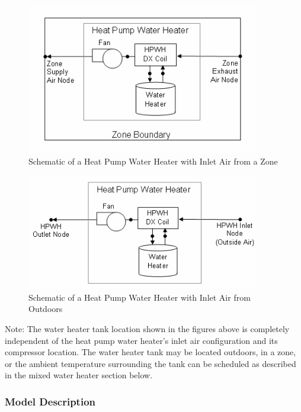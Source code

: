 \begin{figure}[hbtp] %
\centering
\includegraphics[width=0.9\textwidth, height=0.9\textheight, keepaspectratio=true]{media/image6856.png}
\caption{Schematic of a Heat Pump Water Heater with Inlet Air from a Zone \protect \label{fig:schematic-of-a-heat-pump-water-heater-with}}
\end{figure}

\begin{figure}[hbtp] %
\centering
\includegraphics[width=0.9\textwidth, height=0.9\textheight, keepaspectratio=true]{media/image6857.png}
\caption{Schematic of a Heat Pump Water Heater with Inlet Air from Outdoors \protect \label{fig:schematic-of-a-heat-pump-water-heater-with-001}}
\end{figure}

Note: The water heater tank location shown in the figures above is completely independent of the heat pump water heater's inlet air configuration and its compressor location. The water heater tank may be located outdoors, in a zone, or the ambient temperature surrounding the tank can be scheduled as described in the mixed water heater section below.

\subsubsection{Model Description}\label{model-description-016}

